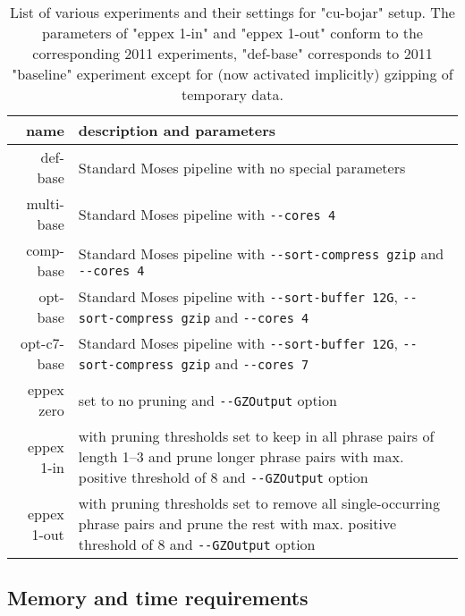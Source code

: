 \begin{table}[ht]
\centering
\begin{tabular}{ r p{10cm} }
name & description and parameters \\
\hline
\hline
def-base        & Standard Moses pipeline with no special parameters \\
multi-base      & Standard Moses pipeline with \verb|--cores 4| \\
comp-base       & Standard Moses pipeline with \verb|--sort-compress gzip|
  and \verb|--cores 4| \\
opt-base        & Standard Moses pipeline with \verb|--sort-buffer 12G|,
  \verb|--sort-compress gzip| and \verb|--cores 4| \\
opt-c7-base     & Standard Moses pipeline with \verb|--sort-buffer 12G|,
  \verb|--sort-compress gzip| and \verb|--cores 7| \\
eppex zero      & \eppex{} set to no pruning and \verb|--GZOutput| option \\
eppex 1-in      & \eppex{} with pruning thresholds set to keep in
  all phrase pairs of length 1--3 and prune longer phrase pairs
  with max. positive threshold of 8 and \verb|--GZOutput| option \\
eppex 1-out     & \eppex{} with pruning thresholds set to remove
  all single-occurring phrase pairs and prune the rest with
  max. positive threshold of 8 and \verb|--GZOutput| option \\
\hline
\hline
\end{tabular}
\caption{\label{cu-bojar-scenarios}List of various experiments and their
settings for "cu-bojar" setup. The parameters of "eppex 1-in" and "eppex 1-out"
conform to the corresponding 2011 experiments, "def-base" corresponds to 2011
"baseline" experiment except for (now activated implicitly) gzipping of
temporary data.}
\end{table}

\subsection{Memory and time requirements}


